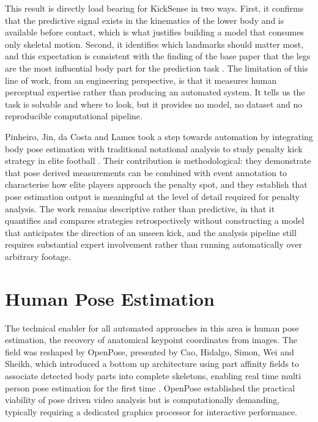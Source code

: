 This result is directly load bearing for KickSense in two ways. First, it confirms that the predictive signal exists in the kinematics of the lower body and is available before contact, which is what justifies building a model that consumes only skeletal motion. Second, it identifies which landmarks should matter most, and this expectation is consistent with the finding of the base paper that the legs are the most influential body part for the prediction task \cite{salazar2024}. The limitation of this line of work, from an engineering perspective, is that it measures human perceptual expertise rather than producing an automated system. It tells us the task is solvable and where to look, but it provides no model, no dataset and no reproducible computational pipeline.

Pinheiro, Jin, da Costa and Lames took a step towards automation by integrating body pose estimation with traditional notational analysis to study penalty kick strategy in elite football \cite{pinheiro2022}. Their contribution is methodological: they demonstrate that pose derived measurements can be combined with event annotation to characterise how elite players approach the penalty spot, and they establish that pose estimation output is meaningful at the level of detail required for penalty analysis. The work remains descriptive rather than predictive, in that it quantifies and compares strategies retrospectively without constructing a model that anticipates the direction of an unseen kick, and the analysis pipeline still requires substantial expert involvement rather than running automatically over arbitrary footage.

\section{Human Pose Estimation}

The technical enabler for all automated approaches in this area is human pose estimation, the recovery of anatomical keypoint coordinates from images. The field was reshaped by OpenPose, presented by Cao, Hidalgo, Simon, Wei and Sheikh, which introduced a bottom up architecture using part affinity fields to associate detected body parts into complete skeletons, enabling real time multi person pose estimation for the first time \cite{cao2019}. OpenPose established the practical viability of pose driven video analysis but is computationally demanding, typically requiring a dedicated graphics processor for interactive performance.

